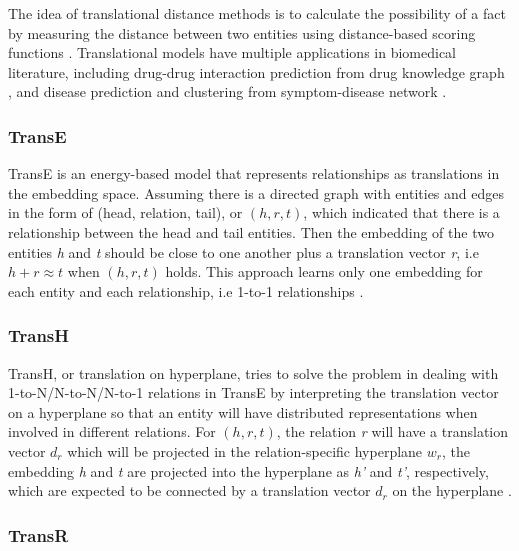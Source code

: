 The idea of translational distance methods is to calculate the possibility of a fact by measuring the distance between two entities using distance-based scoring functions \cite{wang_knowledge_2017}.
Translational models have multiple applications in biomedical literature, including drug-drug interaction prediction from drug knowledge graph \cite{abdelaziz_large-scale_2017, wang_predicting_2017}, and disease prediction and clustering from symptom-disease network \cite{zhao_contextcare:_2017}.

\subsubsection{TransE}

TransE is an energy-based model that represents relationships as translations in the embedding space.
Assuming there is a directed graph with entities and edges in the form of (head, relation, tail), or $(h, r, t)$, which indicated that there is a relationship between the head and tail entities.
Then the embedding of the two entities \textit{h} and \textit{t} should be close to one another plus a translation vector \textit{r}, i.e $h + r \approx t$ when $(h, r, t)$ holds.
This approach learns only one embedding for each entity and each relationship, i.e 1-to-1 relationships \cite{bordes_translating_2013}.

\subsubsection{TransH}
TransH, or translation on hyperplane, tries to solve the problem in dealing with 1-to-N/N-to-N/N-to-1 relations in TransE by interpreting the translation vector on a hyperplane so that an entity will have distributed representations when involved in different relations.
For $(h, r, t)$, the relation \textit{r} will have a translation vector $d_{r}$ which will be projected in the relation-specific hyperplane $w_{r}$, the embedding \textit{h} and \textit{t} are projected into the hyperplane as \textit{h’} and \textit{t’}, respectively, which are expected to be connected by a translation vector $d_{r}$ on the hyperplane \cite{wang_knowledge_2014}.

\subsubsection{TransR}

